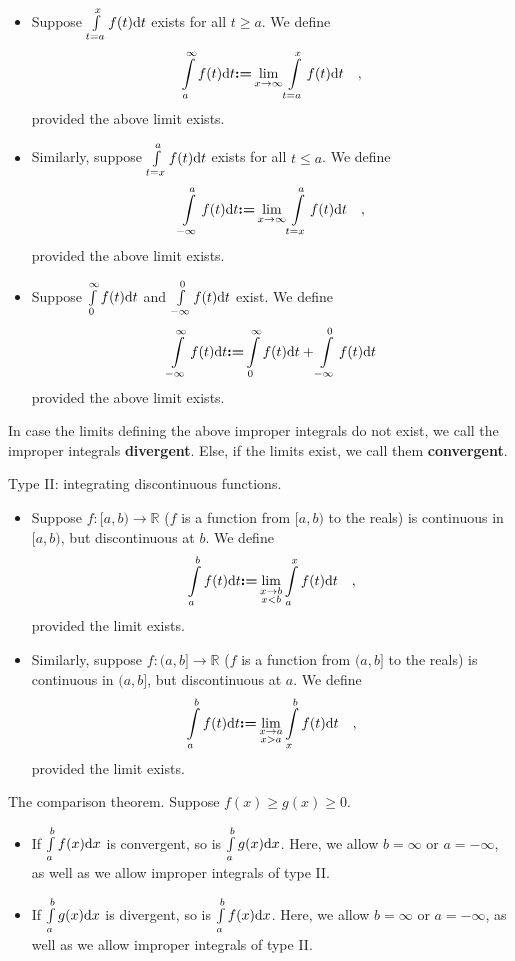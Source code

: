 \documentclass[12pt]{book}
\newcommand{\eqdef}{\textbf{:=}}
\renewcommand{\emph}{\textbf}
\begin{document}
\begin{itemize}
\item Suppose $\int\limits_{t=a}^{x}f(t){\normalfont \text{d}} t$ exists for all $t\geq a$. We define
\[
\int\limits_{a}^{\infty} f(t)\diff t\eqdef  \lim
\limits_{x\to \infty}\int\limits_{t=a}^{x}f(t)\diff t\quad,
\]
provided the above limit exists.
\item Similarly, suppose $\int\limits_{t=x}^{a}f(t){\normalfont \text{d}} t$ exists for all $t\leq a$. We define
\[
\int\limits_{-\infty}^{a} f(t)\diff t\eqdef  \lim
\limits_{x\to \infty}\int\limits_{t=x}^{a}f(t)\diff t\quad,
\]
provided the above limit exists.
\item Suppose $\int\limits_{0}^{\infty}f(t){\normalfont \text{d}} t$ and $\int\limits_{-\infty}^{0}f(t){\normalfont \text{d}} t$  exist. We define
\[
\int\limits_{-\infty}^{\infty} f(t)\diff t\eqdef  \int\limits_{0}^{\infty}f(t)\diff t+\int\limits_{-\infty}^{0}f(t)\diff t
\]
provided the above limit exists.
\end{itemize}
In case the limits defining the above improper integrals do not exist, we call the improper integrals \emph{divergent}. Else, if the limits exist, we call them \emph{convergent}.  

Type II: integrating discontinuous functions.
\begin{itemize}
\item Suppose $f:[a,b)\to \mathbb R$ ($f$ is a function from $[a,b)$ to the reals) is continuous in $[a,b)$, but discontinuous at $b$. We define
\[
\int\limits_{a}^{b}f(t)\diff t\eqdef \lim\limits_{\substack{x\to b \\ x<b}}\int\limits_{a}^{x} f(t)\diff t\quad ,
\]
provided the limit exists.
\item Similarly, suppose $f:(a,b]\to \mathbb R$ ($f$ is a function from $(a,b]$ to the reals) is continuous in $(a,b]$, but discontinuous at $a$. We define
\[
\int\limits_{a}^{b}f(t)\diff t\eqdef \lim\limits_{\substack{x\to a \\ x>a}}\int\limits_{x}^{b} f(t)\diff t\quad ,
\]
provided the limit exists.
\end{itemize}

The comparison theorem. Suppose $f(x)\geq g(x)\geq 0$.
\begin{itemize}
\item If $\int\limits_{a}^{b}f(x){\normalfont \text{d}} x$ is convergent, so is $\int\limits_{a}^{b}g(x){\normalfont \text{d}} x$. Here, we allow $ b=\infty$ or $a=-\infty$, as well as we allow improper integrals of type II.
\item If $\int\limits_{a}^{b}g(x){\normalfont \text{d}} x$ is divergent, so is $\int\limits_{a}^{b}f(x){\normalfont \text{d}} x$. Here, we allow $ b=\infty$ or $a=-\infty$, as well as we allow improper integrals of type II.
\end{itemize}
\end{document}
